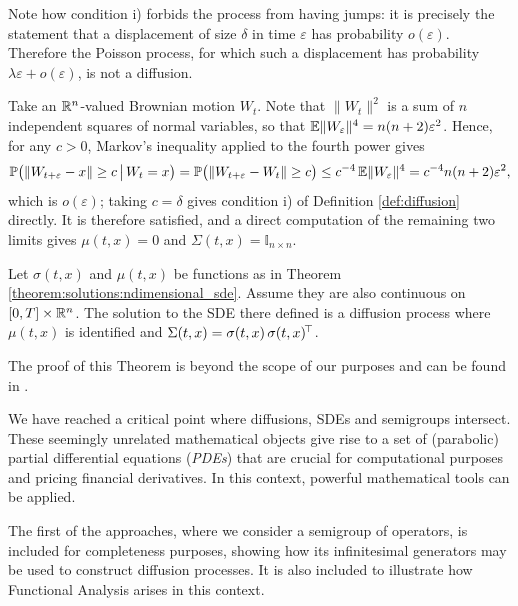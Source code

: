 Note how condition i) forbids the process from having jumps: it is precisely the statement that a displacement of size $\delta$ in time $\varepsilon$ has probability $o(\varepsilon)$. Therefore the Poisson process, for which such a displacement has probability $\lambda\varepsilon + o(\varepsilon)$, is not a diffusion.

\begin{example}\label{example:bmisdiffusion}
    Take an $\mathbb{R}^n$-valued Brownian motion $W_t$. Note that $\lVert W_t\rVert^2$ is a sum of $n$ independent squares of normal variables, so that $\mathbb{E}\lVert W_\varepsilon\rVert^4 = n(n+2)\varepsilon^2$. Hence, for any $c>0$, Markov's inequality applied to the fourth power gives
    \[
    \mathbb{P}\bigl(\lVert W_{t+\varepsilon}-x\rVert\geq c \,\big|\, W_t=x\bigr)
    = \mathbb{P}\bigl(\lVert W_{t+\varepsilon}-W_t\rVert \geq c\bigr)
    \leq c^{-4}\,\mathbb{E}\lVert W_\varepsilon\rVert^4
    = c^{-4}n(n+2)\varepsilon^2 ,
    \]
    which is $o(\varepsilon)$; taking $c = \delta$ gives condition i) of Definition \ref{def:diffusion} directly. It is therefore satisfied, and a direct computation of the remaining two limits gives $\mu(t,x) = 0$ and $\Sigma(t,x)= \mathbb{I}_{n\times n}$.
\end{example}


\begin{theorem}\label{thm:sdeisdiffusion}
    Let $\sigma(t,x)$ and $\mu(t,x)$ be functions as in Theorem \ref{theorem:solutions:ndimensional_sde}. Assume they are also continuous on $[0,T] \times \mathbb{R}^n$. The solution to the SDE there defined is a diffusion process where $\mu(t,x)$ is identified and $\Sigma(t,x)= \sigma(t,x)\,\sigma(t,x)^{\!\top}$. \qedopentext
\end{theorem}

The proof of this Theorem is beyond the scope of our purposes and can be found in \cite{kuo2006}.

We have reached a critical point where diffusions, SDEs and semigroups intersect. These seemingly unrelated mathematical objects give rise to a set of (parabolic) partial differential equations (\textit{PDEs}) that are crucial for computational purposes and pricing financial derivatives. In this context, powerful mathematical tools can be applied.

The first of the approaches, where we consider a semigroup of operators, is included for completeness purposes, showing how its infinitesimal generators may be used to construct diffusion processes. It is also included to illustrate how Functional Analysis arises in this context.
\vspace{0.3cm}

